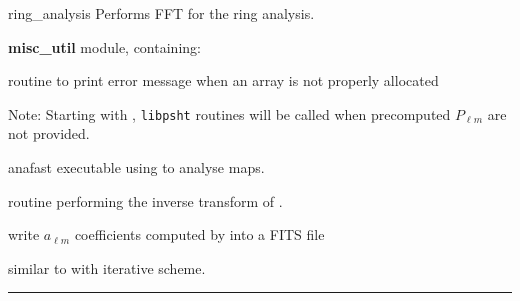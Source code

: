 \begin{modules}
  \begin{sulist}{} %
  \item[ring\_analysis] Performs FFT for the ring analysis.
  \item[\textbf{misc\_util}] module, containing:
  \item[\htmlref{assert\_alloc}{sub:assert}] routine to print error message when an array is not
  properly allocated		
  \end{sulist}
Note: Starting with , {\tt libpsht} routines will be called when
precomputed $P_{\ell m}$ are not provided.
\end{modules}

\begin{related}
  \begin{sulist}{} %
  \item[anafast] executable using \thedocid{} to analyse maps.
  \item[\htmlref{alm2map}{sub:alm2map}] routine performing the inverse transform
of \thedocid.
  \item[\htmlref{dump\_alms}{sub:dump_alms}] write $a_{\ell m}$ coefficients
computed by \thedocid{} into a FITS file
  \item[\htmlref{map2alm\_iterative}{sub:map2alm_iterative}] similar to
\thedocid{} with iterative scheme.
  \end{sulist}
\end{related}

\rule{\hsize}{2mm}

\newpage
